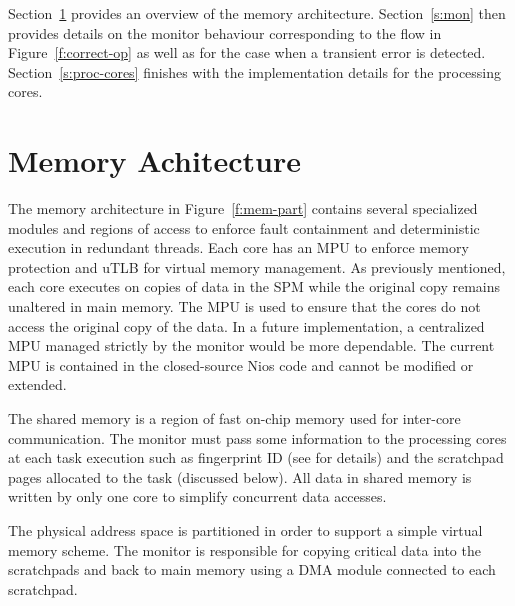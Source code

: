 
	Section~\ref{s:mem-arch} provides an overview of the memory architecture. 
	Section~\ref{s:mon} then provides details on the monitor behaviour corresponding to the flow in Figure~\ref{f:correct-op} as well as for the case when a transient error is detected.
	Section~\ref{s:proc-cores} finishes with the implementation details for the processing cores.

\section{Memory Achitecture}
\label{s:mem-arch}
	The memory architecture in Figure~\ref{f:mem-part} contains several specialized modules and regions of access to enforce fault containment and deterministic execution in redundant threads. 
	Each core has an MPU to enforce memory protection and uTLB for virtual memory management. 
	As previously mentioned, each core executes on copies of data in the SPM while the original copy remains unaltered in main memory. 
	The MPU is used to ensure that the cores do not access the original copy of the data. 
	In a future implementation, a centralized MPU managed strictly by the monitor would be more dependable. 
	The current MPU is contained in the closed-source Nios code and cannot be modified or extended. 

	The shared memory is a region of fast on-chip memory used for inter-core communication. 
	The monitor must pass some information to the processing cores at each task execution such as fingerprint ID (see \cite{ugthesis} for details) and the scratchpad pages allocated to the task (discussed below).
	All data in shared memory is written by only one core to simplify concurrent data accesses. 

	The physical address space is partitioned in order to support a simple virtual memory scheme. 
	The monitor is responsible for copying critical data into the scratchpads and back to main memory using a DMA module connected to each scratchpad.


